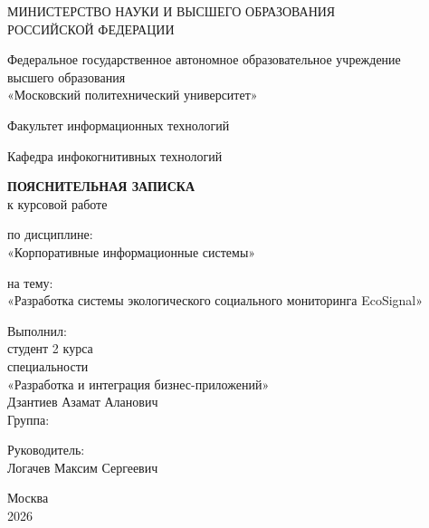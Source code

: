 \documentclass[14pt,a4paper]{extarticle}
\begin{document}
\begin{titlepage}
\thispagestyle{empty}
\begin{center}
{\fontsize{14pt}{16pt}\selectfont
МИНИСТЕРСТВО НАУКИ И ВЫСШЕГО ОБРАЗОВАНИЯ\\
РОССИЙСКОЙ ФЕДЕРАЦИИ

\vspace{0.8cm}

Федеральное государственное автономное образовательное учреждение\\
высшего образования\\
«Московский политехнический университет»

\vspace{0.8cm}

Факультет информационных технологий

\vspace{0.3cm}

Кафедра инфокогнитивных технологий

\vfill

{\arialfont\bfseries ПОЯСНИТЕЛЬНАЯ ЗАПИСКА}\\
к курсовой работе

\vspace{0.8cm}

по дисциплине:\\
«Корпоративные информационные системы»

\vspace{0.8cm}

на тему:\\
«Разработка системы экологического социального мониторинга EcoSignal»

\vfill
}
\end{center}

\begin{flushright}
\begin{minipage}{0.48\textwidth}
Выполнил:\\
студент 2 курса\\
специальности\\
«Разработка и интеграция бизнес-приложений»\\
Дзантиев Азамат Аланович\\
Группа: \underline{\hspace{3.8cm}}

\vspace{0.8cm}

Руководитель:\\
Логачев Максим Сергеевич
\end{minipage}
\end{flushright}

\vfill

\begin{center}
Москва\\
2026
\end{center}
\end{titlepage}
\end{document}
